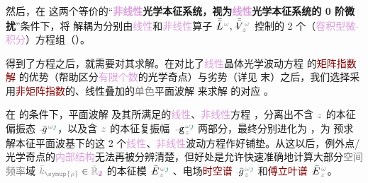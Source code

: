 然后，在  这两个等价的“\textbf{\textcolor{Plum}{非线性}\textcolor{NavyBlue}{光学}\textcolor{PineGreen}{本征系统}，视为\textcolor{Plum}{线性}\textcolor{NavyBlue}{光学}\textcolor{PineGreen}{本征系统}的 \textcolor{NavyBlue}{0 阶微扰}}”条件下，将  解耦为分别由\textcolor{Plum}{线性}和\textcolor{Plum}{非线性}算子 $\xint{\mathcolor{gray}{-}}{30}{\bar{\bar{L}}}^{\;\! \mathcolor{gray}{\omega}},\xint{\mathcolor{gray}{-}}{21}{\bar{\bar{V}}}^{\;\! \mathcolor{gray}{\omega}}_{\;\! \mathcolor{gray}{z}}$ 控制的 2 个（\textcolor{Plum}{卷积型微-积分}）方程组（）。

得到了方程之后，就需要对其求解。在对比了\textcolor{Plum}{线性}\textcolor{PineGreen}{晶体光学}波动方程  的\textcolor{Maroon}{矩阵指数解}  的优势（帮助区分\textcolor{Plum}{有限个数}的\textcolor{PineGreen}{光学奇点}）与劣势（详见  末）之后，我们选择采用\textcolor{Maroon}{非矩阵指数}的、\textcolor{PineGreen}{线性叠加}的\textcolor{gray}{单色}\textcolor{PineGreen}{平面波解}  来求解  的对应 。

在  的条件下，\textcolor{PineGreen}{平面波解}  及其所满足的\textcolor{Plum}{线性}、\textcolor{Plum}{非线性}方程 ，分离出不含 $\mathcolor{gray}{z}$ 的\textcolor{PineGreen}{本征偏振态} $\xint{{}^{}_{\mathcolor{gray}{-}}}{10}{\bar{g}}^{\;\!\mathcolor{gray}{\omega} \textcolor{PineGreen}{\jmath}}$，以及含 $\mathcolor{gray}{z}$ 的\textcolor{PineGreen}{本征复振幅} $\xint{\begin{smallmatrix} ~ \\ {}^{}_{\mathcolor{gray}{-}} \\ ~ \end{smallmatrix}}{09}{\mathtt{g}}^{\;\!\mathcolor{gray}{\omega} \textcolor{PineGreen}{\jmath}}_{\;\! \mathcolor{gray}{z}}$ 两部分，最终分别进化为 ，为  预求解\textcolor{PineGreen}{本征平面波基}下的这 2 个\textcolor{Plum}{线性}、\textcolor{Plum}{非线性}波动方程作好铺垫。从这以后，\textcolor{PineGreen}{例外点}/\textcolor{PineGreen}{光学奇点}的\textcolor{Plum}{内部结构}无法再被分辨清楚，但好处是允许快速准确地计算大部分\textcolor{gray}{空间频率}域 $\mathcolor{gray}{\bar{k}_{\symup{\rho}}} \in \mathcolor{gray}{\bar{\mathbb{R}}_{\textcolor{Plum}{2}}}$ 的\textcolor{PineGreen}{本征模} $\xint{\mathcolor{gray}{-}}{25}{\bar{E}}^{\;\!\mathcolor{gray}{\omega} \textcolor{PineGreen}{\jmath}}_{\;\! \mathcolor{gray}{z}}$ 、电场\textcolor{Maroon}{时空谱} $\xint{{}^{}_{\mathcolor{gray}{-}}}{10}{\bar{g}}^{\;\!\mathcolor{gray}{\omega} \textcolor{PineGreen}{\jmath}}_{\;\! \mathcolor{gray}{z}}$ 和\textcolor{Maroon}{傅立叶谱} $\xint{\mathcolor{gray}{-}}{25}{\bar{E}}^{\;\!\mathcolor{gray}{\omega}}_{\;\! \mathcolor{gray}{z}}$。



